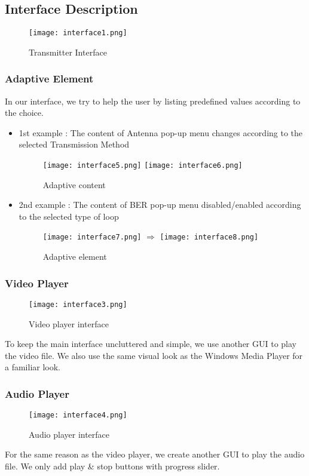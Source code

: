 \documentclass[12pt,a4paper]{article}
\begin{document}
\clearpage
\subsection{Interface Description}
\begin{figure}[ht]
  \centering
    \texttt{[image: interface1.png]}
  \caption{Transmitter Interface}
  \label{fig:interface1 }
\end{figure}
\clearpage
\subsubsection{Adaptive Element}
In our interface, we try to help the user by listing predefined values according to the choice.
\begin{itemize}
	\item 1st example : The content of Antenna pop-up menu changes according to the selected Transmission Method
	\begin{figure}[ht]
		\centering
			\texttt{[image: interface5.png]}  \texttt{[image: interface6.png]}
		\caption{Adaptive content}
		\label{fig:interface5&6 }
	\end{figure}
	\item 2nd example : The content of BER pop-up menu disabled/enabled according to the selected type of loop
	\begin{figure}[ht]
		\centering
			\texttt{[image: interface7.png]} $\Rightarrow$ \texttt{[image: interface8.png]}
		\caption{Adaptive element}
		\label{fig:interface7&8 }
	\end{figure}
\end{itemize}
\clearpage
\subsubsection{Video Player}
\begin{figure}[ht]
	\centering
		\texttt{[image: interface3.png]}
	\caption{Video player interface}
	\label{fig:interfacevid }
\end{figure}
\par \vspace{0.25cm}To keep the main interface uncluttered and simple, we use another GUI to play the video file. We also use the same visual look as the Windows Media Player for a familiar look.
\subsubsection{Audio Player}
\begin{figure}[ht]
	\centering
		\texttt{[image: interface4.png]}
	\caption{Audio player interface}
	\label{fig:interfaceaud }
\end{figure}
\par \vspace{0.25cm}For the same reason as the video player, we create another GUI to play the audio file. We only add play \& stop buttons with progress slider.
\end{document}
